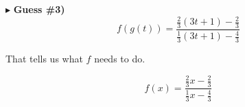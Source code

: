 \documentclass{ximera}
\begin{document}
\begin{example}
\begin{explanation}
$\blacktriangleright$  \textbf{\textcolor{blue!55!black}{Guess \#3)}}   \\


\[   f(g(t)) =      \frac{\frac{2}{3}(3t + 1) - \frac{2}{3}}{\frac{1}{3}(3t + 1) - \frac{4}{3}}       \]

That tells us what $f$ needs to do.




\[   f(x) =      \frac{\frac{2}{3}x - \frac{2}{3}}{\frac{1}{3}x - \frac{4}{3}}       \]



\end{explanation}

\end{example}
\end{document}
